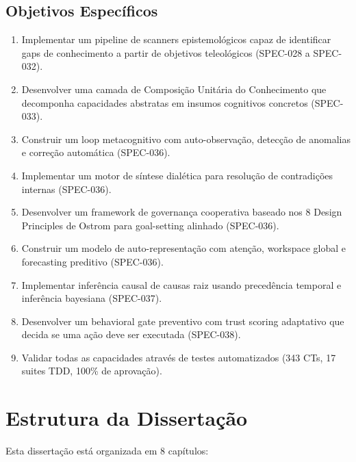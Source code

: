 \documentclass[12pt,a4paper,oneside]{abntex2}
\begin{document}
\subsection{Objetivos Específicos}

\begin{enumerate}
    \item Implementar um pipeline de scanners epistemológicos capaz de identificar gaps de conhecimento a partir de objetivos teleológicos (SPEC-028 a SPEC-032).
    \item Desenvolver uma camada de Composição Unitária do Conhecimento que decomponha capacidades abstratas em insumos cognitivos concretos (SPEC-033).
    \item Construir um loop metacognitivo com auto-observação, detecção de anomalias e correção automática (SPEC-036).
    \item Implementar um motor de síntese dialética para resolução de contradições internas (SPEC-036).
    \item Desenvolver um framework de governança cooperativa baseado nos 8 Design Principles de Ostrom para goal-setting alinhado (SPEC-036).
    \item Construir um modelo de auto-representação com atenção, workspace global e forecasting preditivo (SPEC-036).
    \item Implementar inferência causal de causas raiz usando precedência temporal e inferência bayesiana (SPEC-037).
    \item Desenvolver um behavioral gate preventivo com trust scoring adaptativo que decida se uma ação deve ser executada (SPEC-038).
    \item Validar todas as capacidades através de testes automatizados (343 CTs, 17 suites TDD, 100\% de aprovação).
\end{enumerate}

\section{Estrutura da Dissertação}

Esta dissertação está organizada em 8 capítulos:
\end{document}
